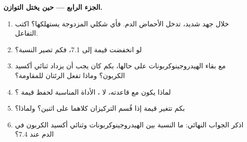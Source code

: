 \begin{problem}
\medskip
\noindent\textbf{الجزء الرابع --- حين يختل التوازن.}
\begin{enumerate}[resume]
  \item خلال جهد شديد، تدخل الأحماض الدم. فأي شكلي
        المزدوجة يستهلكها؟ اكتب التفاعل.
  \item لو انخفضت قيمة  إلى 7.1، فكم تصير النسبة؟
  \item مع بقاء الهيدروجينوكربونات على حالها، بكم كان يجب أن يزداد ثنائي
        أكسيد الكربون؟ وماذا تفعل الرئتان للمقاومة؟
  \item لماذا يكون  مع قاعدته، لا ، الأداة
        المناسبة لحفظ قيمة ؟
  \item بكم تتغير قيمة  إذا قُسم التركيزان كلاهما
        على اثنين؟ ولماذا؟
  \item اذكر الجواب النهائي: ما النسبة بين الهيدروجينوكربونات وثنائي أكسيد
        الكربون في الدم عند  7.4؟
\end{enumerate}
\end{problem}
